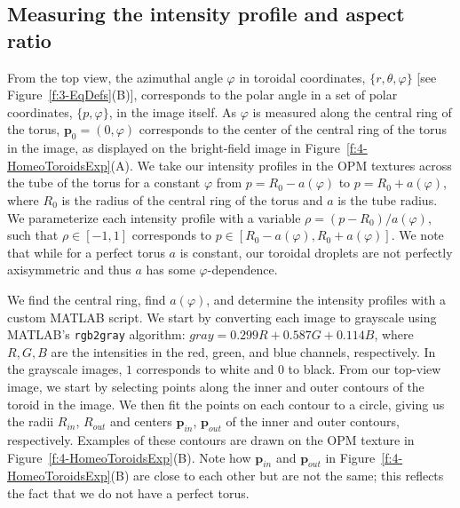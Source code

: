 \subsection{Measuring the intensity profile and aspect ratio}
From the top view, the azimuthal angle $\varphi$ in toroidal coordinates, $\{r,\theta,\varphi \}$ [see Figure~\ref{f:3-EqDefs}(B)], corresponds to the polar angle in a set of polar coordinates, $\{p,\varphi \}$, in the image itself.
As $\varphi$ is measured along the central ring of the torus, $\mathbf{p}_0 = (0,\varphi)$ corresponds to the center of the central ring of the torus in the image, as displayed on the bright-field image in Figure~\ref{f:4-HomeoToroidsExp}(A).
We take our intensity profiles in the OPM textures across the tube of the torus for a constant $\varphi$ from $p = R_0 - a(\varphi)$ to $p = R_0+ a(\varphi)$, where $R_0$ is the radius of the central ring of the torus and $a$ is the tube radius.
We parameterize each intensity profile with a variable $\rho = (p - R_0)/a(\varphi)$, such that $\rho \in [-1,1]$ corresponds to $p \in [R_0 - a(\varphi),R_0 + a(\varphi)]$.
We note that while for a perfect torus $a$ is constant, our toroidal droplets are not perfectly axisymmetric and thus $a$ has some $\varphi$-dependence.

We find the central ring, find $a(\varphi)$, and determine the intensity profiles with a custom MATLAB script.
We start by converting each image to grayscale using MATLAB's \texttt{rgb2gray} algorithm: $\mathit{gray} = 0.299 R + 0.587 G + 0.114 B$, where $R,G,B$ are the intensities in the red, green, and blue channels, respectively.
In the grayscale images, $1$ corresponds to white and $0$ to black.
From our top-view image, we start by selecting points along the inner and outer contours of the toroid in the image.
We then fit the points on each contour to a circle, giving us the radii $R_{in}$, $R_{out}$ and centers $\mathbf{p}_{in}$, $\mathbf{p}_{out}$ of the inner and outer contours, respectively.
Examples of these contours are drawn on the OPM texture in Figure~\ref{f:4-HomeoToroidsExp}(B).
Note how $\mathbf{p}_{in}$ and $\mathbf{p}_{out}$ in Figure~\ref{f:4-HomeoToroidsExp}(B) are close to each other but are not the same; this reflects the fact that we do not have a perfect torus.

